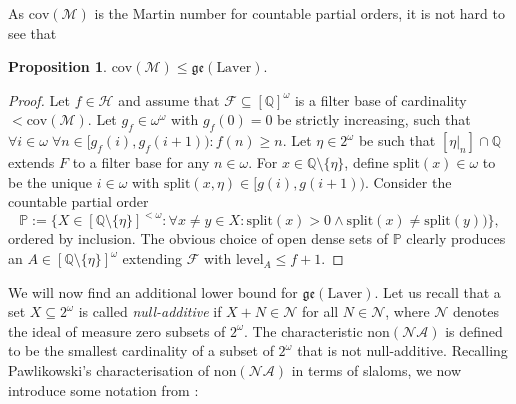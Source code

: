 \documentclass[12pt]{article}
\theoremstyle{definition}
\newtheorem{prp}[nummer]{\sc Proposition}
\newcommand\level{\text{level}}
\begin{document}

As $\text{cov}(\mathcal{M})$ is the Martin number for countable partial orders, it is not hard to see that

\begin{prp}\label{prp:lowerboundcov}
$\text{cov}(\mathcal{M})\leq\mathfrak{ge}(\text{Laver})$.
\end{prp}

\begin{proof}
Let $f\in \mathcal{H}$ and assume that $\mathcal{F} \subseteq [\mathbb{Q}]^\omega$ is a filter base of cardinality $<\text{cov}(\mathcal{M})$. Let $g_f\in \omega^\omega$ with $g_f(0)=0$ be strictly increasing, such that $\forall i \in \omega \;\forall n \in [g_f(i), g_f(i+1)): f(n)\geq n$. Let $\eta \in 2^{\omega}$ be such that $[\eta|_n]\cap \mathbb{Q}$ extends $F$ to a filter base for any $n \in \omega$. For $x\in \mathbb{Q}\setminus \{\eta\}$, define $\text{split}(x)\in \omega$ to be the unique $i \in \omega$ with $\text{split}(x, \eta)\in [g(i), g(i+1))$. Consider the countable partial order
\[\mathbb{P}:=\{X \in [\mathbb{Q}\setminus \{\eta\}]^{<\omega}: \forall x\neq y \in X: \text{split}(x)>0 \land \text{split}(x)\neq \text{split}(y)) \},\]
ordered by inclusion. The obvious choice of open dense sets of $\mathbb{P}$ clearly produces an $A \in [\mathbb{Q}\setminus \{\eta\}]^{\omega}$ extending $\mathcal{F}$ with $\level_A \leq f+1$.
\end{proof}

We will now find an additional lower bound for $\mathfrak{ge}(\text{Laver})$. Let us recall that a set $X\subseteq2^\omega$ is called \emph{null-additive} if $X+N\in\mathcal{N}$ for all $N\in\mathcal{N}$, where $\mathcal{N}$ denotes the ideal of measure zero subsets of $2^\omega$. The characteristic $\text{non}(\mathcal{NA})$ is defined to be the smallest cardinality of a subset of $2^\omega$ that is not null-additive. Recalling Pawlikowski's \cite{paw} characterisation of $\text{non}(\mathcal{NA})$ in terms of slaloms, we now introduce some notation from \cite{carmej}:
\end{document}
